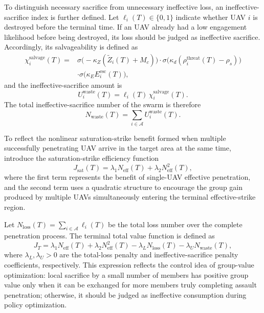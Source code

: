 \documentclass{cja}
\begin{document}
To distinguish necessary sacrifice from unnecessary ineffective loss, an ineffective-sacrifice index is further defined. Let $\ell_i(T)\in\{0,1\}$ indicate whether UAV $i$ is destroyed before the terminal time. If an UAV already had a low engagement likelihood before being destroyed, its loss should be judged as ineffective sacrifice. Accordingly, its salvageability is defined as
\begin{equation}
\begin{aligned}
\chi_i^{\mathrm{salvage}}(T)
={}&
\sigma\!\bigl(-\kappa_Z(\widetilde Z_i(T)+M_c)\bigr)
\cdot
\sigma\!\bigl(\kappa_d(\rho_i^{\mathrm{threat}}(T)-\rho_s)\bigr)\\
&\cdot
\sigma\!\bigl(\kappa_E E_i^{\mathrm{esc}}(T)\bigr),
\end{aligned}
\end{equation}
and the ineffective-sacrifice amount is
\begin{equation}
U_i^{\mathrm{waste}}(T)
=
\ell_i(T)\,\chi_i^{\mathrm{salvage}}(T).
\end{equation}
The total ineffective-sacrifice number of the swarm is therefore
\begin{equation}
N_{\mathrm{waste}}(T)
=
\sum_{i\in\mathcal{A}} U_i^{\mathrm{waste}}(T).
\end{equation}

To reflect the nonlinear saturation-strike benefit formed when multiple successfully penetrating UAV arrive in the target area at the same time, introduce the saturation-strike efficiency function
\begin{equation}
J_{\mathrm{sat}}(T)
=
\lambda_1 N_{\mathrm{eff}}(T)
+
\lambda_2 N_{\mathrm{eff}}^2(T),
\end{equation}
where the first term represents the benefit of single-UAV effective penetration, and the second term uses a quadratic structure to encourage the group gain produced by multiple UAVs simultaneously entering the terminal effective-strike region.

Let $N_{\mathrm{loss}}(T)=\sum_{i\in\mathcal{A}}\ell_i(T)$ be the total loss number over the complete penetration process. The terminal total value function is defined as
\begin{equation}
J_T
=
\lambda_1 N_{\mathrm{eff}}(T)
+
\lambda_2 N_{\mathrm{eff}}^2(T)
-
\lambda_L N_{\mathrm{loss}}(T)
-
\lambda_U N_{\mathrm{waste}}(T),
\end{equation}
where $\lambda_L,\lambda_U>0$ are the total-loss penalty and ineffective-sacrifice penalty coefficients, respectively. This expression reflects the control idea of group-value optimization: local sacrifice by a small number of members has positive group value only when it can be exchanged for more members truly completing assault penetration; otherwise, it should be judged as ineffective consumption during policy optimization.
\end{document}
